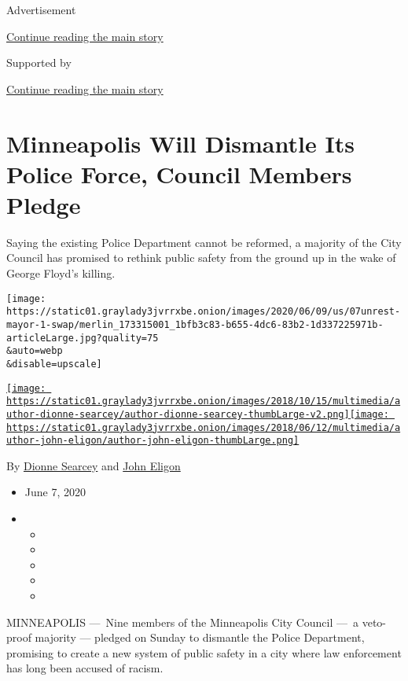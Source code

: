 Advertisement

\protect\hyperlink{after-top}{Continue reading the main story}

Supported by

\protect\hyperlink{after-sponsor}{Continue reading the main story}

\hypertarget{minneapolis-will-dismantle-its-police-force-council-members-pledge}{%
\section{Minneapolis Will Dismantle Its Police Force, Council Members
Pledge}\label{minneapolis-will-dismantle-its-police-force-council-members-pledge}}

Saying the existing Police Department cannot be reformed, a majority of
the City Council has promised to rethink public safety from the ground
up in the wake of George Floyd's killing.

\texttt{[image: https://static01.graylady3jvrrxbe.onion/images/2020/06/09/us/07unrest-mayor-1-swap/merlin\_173315001\_1bfb3c83-b655-4dc6-83b2-1d337225971b-articleLarge.jpg?quality=75\\\&auto=webp\\\&disable=upscale]}

\href{https://www.nytimes3xbfgragh.onion/by/dionne-searcey}{\texttt{[image: https://static01.graylady3jvrrxbe.onion/images/2018/10/15/multimedia/author-dionne-searcey/author-dionne-searcey-thumbLarge-v2.png]}}\href{https://www.nytimes3xbfgragh.onion/by/john-eligon}{\texttt{[image: https://static01.graylady3jvrrxbe.onion/images/2018/06/12/multimedia/author-john-eligon/author-john-eligon-thumbLarge.png]}}

By \href{https://www.nytimes3xbfgragh.onion/by/dionne-searcey}{Dionne
Searcey} and
\href{https://www.nytimes3xbfgragh.onion/by/john-eligon}{John Eligon}

\begin{itemize}
\item
  June 7, 2020
\item
  \begin{itemize}
  \item
  \item
  \item
  \item
  \item
  \end{itemize}
\end{itemize}

MINNEAPOLIS ---~Nine members of the Minneapolis City Council ---~a
veto-proof majority --- pledged on Sunday to dismantle the Police
Department, promising to create a new system of public safety in a city
where law enforcement has long been accused of racism.

